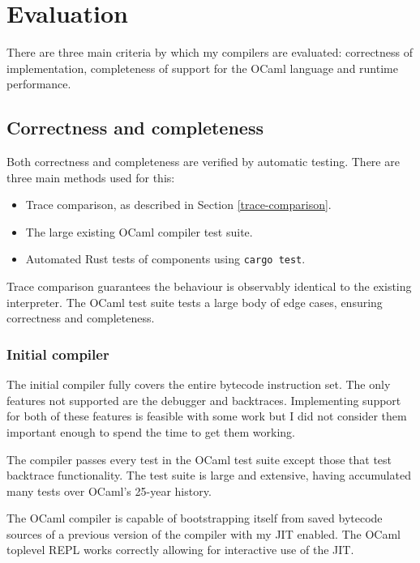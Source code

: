 \chapter{Evaluation}

There are three main criteria by which my compilers are evaluated: correctness of implementation,
completeness of support for the OCaml language and runtime performance.

\section{Correctness and completeness}

Both correctness and completeness are verified by automatic testing. There are three main methods
used for this:

\begin{itemize}
    \item Trace comparison, as described in Section \ref{trace-comparison}.
    \item The large existing OCaml compiler test suite.
    \item Automated Rust tests of components using \texttt{cargo test}.
\end{itemize}

Trace comparison guarantees the behaviour is observably identical to the existing interpreter. The
OCaml test suite tests a large body of edge cases, ensuring correctness and completeness.

\subsection{Initial compiler}

The initial compiler fully covers the entire bytecode instruction set. The only features not
supported are the debugger and backtraces. Implementing support for both of these features is
feasible with some work but I did not consider them important enough to spend the time to get them
working.

The compiler passes every test in the OCaml test suite except those that test backtrace
functionality. The test suite is large and extensive, having accumulated many tests over OCaml's
25-year history.

The OCaml compiler is capable of bootstrapping itself from saved bytecode sources
of a previous version of the compiler with my JIT enabled. The OCaml toplevel REPL works
correctly allowing for interactive use of the JIT.

